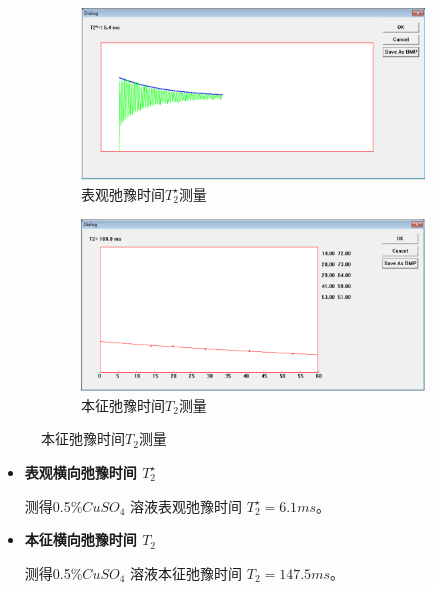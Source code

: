 \documentclass[12pt,a4paper]{article}
\begin{document}
\begin{figure}[ht]
\centering
\begin{subfigure}[b]{0.45\textwidth}
    \includegraphics[width=\textwidth]{脉冲表观弛豫时间.png}
    \caption{表观弛豫时间$T_2^{\star}$测量}
\end{subfigure}
\hfill %
\begin{subfigure}[b]{0.45\textwidth}
    \includegraphics[width=\textwidth]{脉冲弛豫时间.png}
    \caption{本征弛豫时间$T_2$测量}
\end{subfigure}

\end{figure}




\begin{itemize}
    \item \textbf{表观横向弛豫时间 $T_2^{\star}$}

    测得0.5\%$CuS O_4$ 溶液表观弛豫时间 $T_2^{\star} = 6.1ms$。

    \item \textbf{本征横向弛豫时间 $T_2$}
    
    测得0.5\%$CuS O_4$ 溶液本征弛豫时间 $T_2 = 147.5ms$。
\end{itemize}
\end{document}
